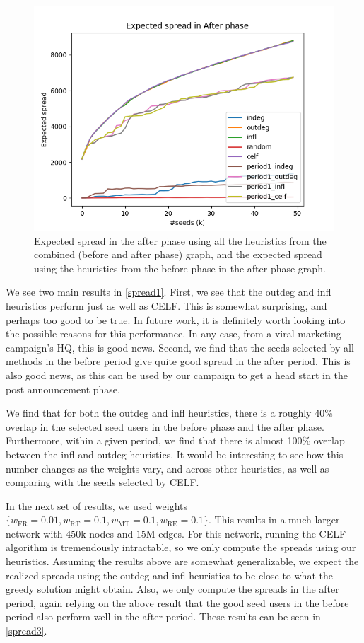 \documentclass[sigconf]{acmart}
\begin{document}
\begin{figure}[htbp]
\begin{center}
\includegraphics[width=0.9\linewidth]{Figures/period2.png}
\caption{Expected spread in the after phase using all the heuristics from the combined (before and after phase) graph, and the expected spread using the heuristics from the before phase in the after phase graph.}
\label{spread2}
\end{center}
\end{figure}

We see two main results in \autoref{spread1}. First, we see that the outdeg and infl heuristics perform just as well as CELF. This is somewhat surprising, and perhaps too good to be true. In future work, it is definitely worth looking into the possible reasons for this performance. In any case, from a viral marketing campaign's HQ, this is good news. Second, we find that the seeds selected by all methods in the before period give quite good spread in the after period. This is also good news, as this can be used by our campaign to get a head start in the post announcement phase.

We find that for both the outdeg and infl heuristics, there is a roughly 40\% overlap in the selected seed users in the before phase and the after phase. Furthermore, within a given period, we find that there is almost 100\% overlap between the infl and outdeg heuristics. It would be interesting to see how this number changes as the weights vary, and across other heuristics, as well as comparing with the seeds selected by CELF.

In the next set of results, we used weights $\{w_{\text{FR}} = 0.01, w_{\text{RT}} = 0.1, w_{\text{MT}} = 0.1, w_{\text{RE}} = 0.1\}$. This results in a much larger network with $450$k nodes and $15$M edges. For this network, running the CELF algorithm is tremendously intractable, so we only compute the spreads using our heuristics. Assuming the results above are somewhat generalizable, we expect the realized spreads using the outdeg and infl heuristics to be close to what the greedy solution might obtain. Also, we only compute the spreads in the after period, again relying on the above result that the good seed users in the before period also perform well in the after period. These results can be seen in \autoref{spread3}. 
\end{document}
